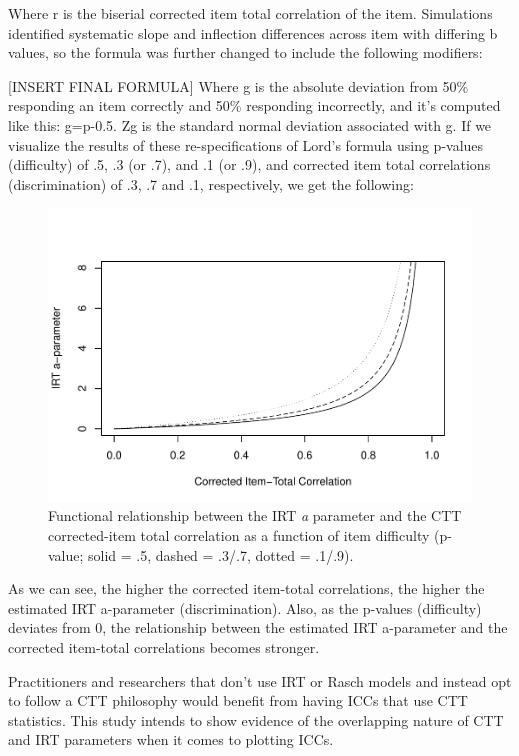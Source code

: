\documentclass[
  english,
  man,floatsintext]{apa6}
\begin{document}
Where r is the biserial corrected item total correlation of the item. Simulations identified systematic slope and inflection differences across item with differing b values, so the formula was further changed to include the following modifiers:

{[}INSERT FINAL FORMULA{]}
Where g is the absolute deviation from 50\% responding an item correctly and 50\% responding incorrectly, and it's computed like this: g=\textbar p-0.5\textbar. Zg is the standard normal deviation associated with g. If we visualize the results of these re-specifications of Lord's formula using p-values (difficulty) of .5, .3 (or .7), and .1 (or .9), and corrected item total correlations (discrimination) of .3, .7 and .1, respectively, we get the following:

\begin{figure}
\centering
\includegraphics{ICC_project_files/figure-latex/acorrected-1.pdf}
\caption{\label{fig:acorrected}Functional relationship between the IRT \emph{a} parameter and the CTT corrected-item total correlation as a function of item difficulty (p-value; solid = .5, dashed = .3/.7, dotted = .1/.9).}
\end{figure}

As we can see, the higher the corrected item-total correlations, the higher the estimated IRT a-parameter (discrimination). Also, as the p-values (difficulty) deviates from 0, the relationship between the estimated IRT a-parameter and the corrected item-total correlations becomes stronger.

Practitioners and researchers that don't use IRT or Rasch models and instead opt to follow a CTT philosophy would benefit from having ICCs that use CTT statistics. This study intends to show evidence of the overlapping nature of CTT and IRT parameters when it comes to plotting ICCs.
\end{document}
